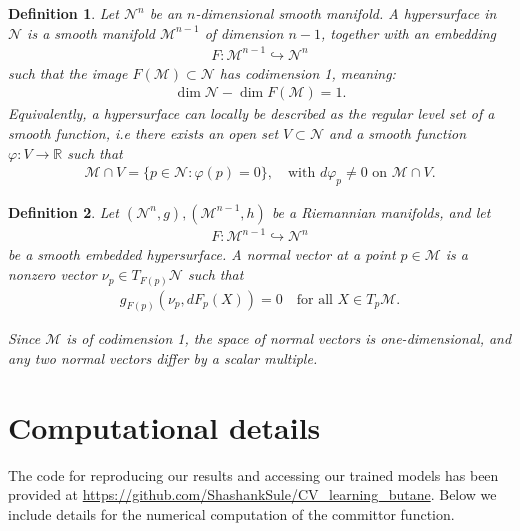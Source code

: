 \documentclass[reqno, 12pt]{article}
\newtheorem{definition}{Definition}
\begin{document}
\begin{definition}
\label{def: hypersurface}
Let $\mathcal{N}^n$ be an $n$-dimensional smooth manifold. A hypersurface in $\mathcal{N}$ is a smooth manifold $\mathcal{M}^{n-1}$ of dimension $n-1$, together with an embedding  
\begin{align}
F : \mathcal{M}^{n-1} \hookrightarrow \mathcal{N}^n
\end{align}  
such that the image $F(\mathcal{M}) \subset \mathcal{N}$ has codimension 1, meaning:  
\begin{align}
\dim \mathcal{N} - \dim F(\mathcal{M}) = 1.
\end{align}    
Equivalently, a hypersurface can locally be described as the regular level set of a smooth function, i.e there exists an open set $V \subset \mathcal{N}$ and a smooth function $\varphi: V \to \mathbb{R}$ such that  
\begin{align}
\mathcal{M} \cap V= \{ p \in \mathcal{N} : \varphi(p) = 0 \}, \quad \text{with } d\varphi_p \neq 0 \text{ on } \mathcal{M} \cap V.
\end{align}
\end{definition}

\begin{definition}
\label{def: normal vector}
Let $(\mathcal{N}^n, g), (\mathcal{M}^{n-1}, h)$ be a Riemannian manifolds, and let  
\begin{align}
F : \mathcal{M}^{n-1} \hookrightarrow \mathcal{N}^n
\end{align}  
be a smooth embedded hypersurface. A normal vector at a point $p \in \mathcal{M}$ is a nonzero vector $\nu_p \in T_{F(p)} \mathcal{N}$ such that  
\begin{align}
g_{F(p)}(\nu_p, dF_p(X)) = 0 \quad \text{for all } X \in T_p \mathcal{M}.
\end{align}

Since $\mathcal{M}$ is of codimension 1, the space of normal vectors is one-dimensional, and any two normal vectors differ by a scalar multiple.    
\end{definition}

\section{Computational details}

\label{app: Computational details}
The code for reproducing our results and accessing our trained models has been provided at \url{https://github.com/ShashankSule/CV_learning_butane}. Below we include details for the numerical computation of the committor function. 
\end{document}
